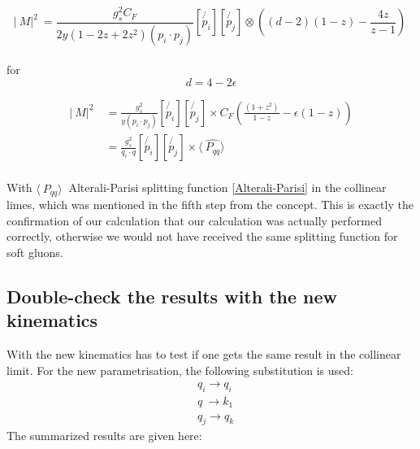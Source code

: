 \begin{equation}
\lvert\:M\lvert^2\: = \frac{g_s^2 C_F}{2y(1-2z+2z^2)(p_i \cdot p_j)}[\not{p_i}][\not{p_j}] \otimes((d-2)(1-z)-\frac{4z}{z-1})\:
\end{equation}
\\
for
\begin{equation}
d=4-2\epsilon
\end{equation}

\begin{equation}
\begin{split}
\lvert\:M\lvert^2\: &=\frac{g_s^2}{y(p_i \cdot p_j)}[\not{p_i}][\not{p_j}]\times C_F(\frac{(1+z^2)}{1-z}-\epsilon(1-z))\\
&=\frac{g_s^2}{q_i \cdot q}[\not{p_i}][\not{p_j}]\times \langle\:\hat{P_{qq}}\rangle\:\\
\label{coll}
\end{split}
\end{equation}

With $ \langle\:\hat{P_{qq}}\rangle\: $ Alterali-Parisi splitting function \ref{Alterali-Parisi}  in the collinear limes, which was mentioned in the fifth step from the concept. This is exactly the confirmation of our calculation that our calculation was actually performed correctly, otherwise we would not have received the same splitting function for soft gluons.
\newpage

\subsection{Double-check the results with the new kinematics}
With the new kinematics has to test if one gets the same result in the collinear limit. For the new parametrisation, the following substitution is used:
\begin{equation}
\begin{split}
&q_i \rightarrow q_i\\
&q \: \rightarrow k_1\\
&q_j \rightarrow q_k
\end{split}
\end{equation}
The summarized results are given here: 
